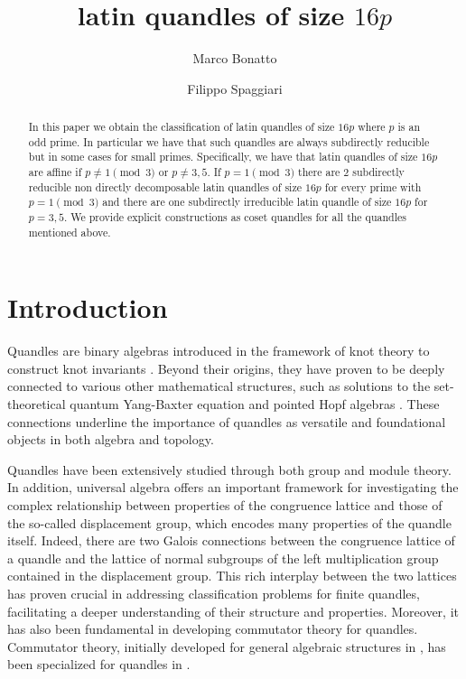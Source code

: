 \documentclass[a4paper, english, 9pt]{amsart}
\title{latin quandles of size $16p$}
\author{Marco Bonatto \and Filippo Spaggiari}
\theoremstyle{plain}
\theoremstyle{definition}
\begin{document}
\begin{abstract}
    In this paper we obtain the classification of latin quandles of size $16p$ where $p$ is an odd prime. In particular we have that such quandles are always subdirectly reducible but in some cases for small primes. Specifically, we have that latin quandles of size $16p$ are affine if $p\neq 1 \pmod{3}$ or $p\neq 3,5$. If $p=1\pmod 3$ there are $2$ subdirectly reducible non directly decomposable latin quandles of size $16p$ for every prime with $p=1\pmod{3}$ and there are one subdirectly irreducible latin quandle of size $16p$ for $p=3,5$. We provide explicit constructions as coset quandles for all the quandles mentioned above.
\end{abstract}
\maketitle




\section*{Introduction}

Quandles are binary algebras introduced in the framework of knot theory to construct knot invariants \cite{J, Matveev}. Beyond their origins, they have proven to be deeply connected to various other mathematical structures, such as solutions to the set-theoretical quantum Yang-Baxter equation \cite{etingof2001indecomposable, etingof1999set} and pointed Hopf algebras \cite{AG}. These connections underline the importance of quandles as versatile and foundational objects in both algebra and topology.

Quandles have been extensively studied through both group and module theory. In addition, universal algebra offers an important framework for investigating the complex relationship between properties of the congruence lattice and those of the so-called displacement group, which encodes many properties of the quandle itself. Indeed, there are two Galois connections between the congruence lattice of a quandle and the lattice of normal subgroups of the left multiplication group contained in the displacement group. This rich interplay between the two lattices has proven crucial in addressing classification problems for finite quandles, facilitating a deeper understanding of their structure and properties. Moreover, it has also been fundamental in developing commutator theory for quandles. Commutator theory, initially developed for general algebraic structures in \cite{comm}, has been specialized for quandles in \cite{CP}.
\end{document}
